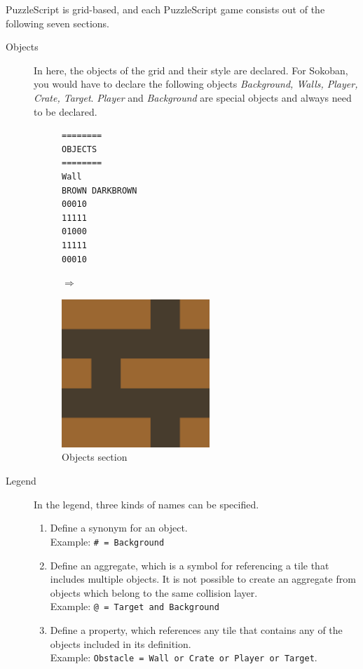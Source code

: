 PuzzleScript is grid-based, and each PuzzleScript game consists out of the following seven sections.
\begin{description}
    \item[Objects] In here, the objects of the grid and their style are declared. For Sokoban, you would have to declare the following objects \textit{Background, Walls, Player, Crate, Target}. \textit{Player} and \textit{Background} are special objects and always need to be declared. \hfill
        \begin{figure}[!htbp]
    \begin{minipage}{0.4\textwidth}
        \centering
    \begin{lstlisting}
========
OBJECTS
========
Wall
BROWN DARKBROWN
00010
11111
01000
11111
00010
    \end{lstlisting}
    
    \end{minipage} \qquad $\Longrightarrow$ \hfill
    \begin{minipage}{0.4\textwidth}
        
        \includegraphics[width=0.55\textwidth]{figures/wallimg.png}
    \end{minipage}
    \caption{Objects section}
    \end{figure}



    \item[Legend] In the legend,  three kinds of names can be specified.
        \begin{enumerate}
            \item Define a synonym for an object. \hfill \\
            Example: \lstinline{# = Background}
            \item Define an aggregate, which is a symbol for referencing a tile that includes multiple objects. It is not possible to create an aggregate from objects which belong to the same collision layer. \hfill \\
            Example: \lstinline{@ = Target and Background}
            \item Define a property, which references any tile that contains any of the objects included in its definition. \hfill \\
            Example: \lstinline{Obstacle = Wall or Crate or Player or Target}.
        \end{enumerate}
        

\end{description}
